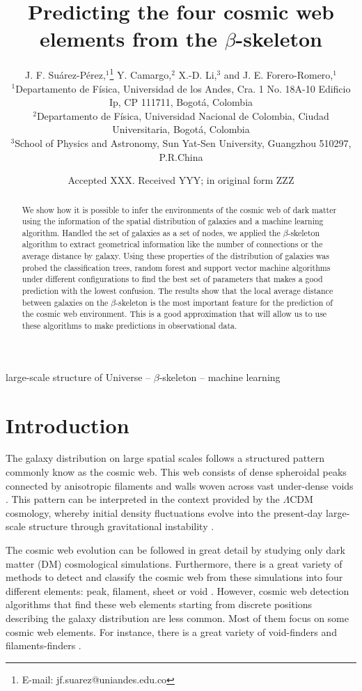 \documentclass[usenatbib]{mnras}
\title[Cosmic web elements and the $\beta$-skeleton]{Predicting the four cosmic web
  elements from the $\beta$-skeleton}
\author[J. F. Su\'arez-P\'erez et al.]{
J. F. Su\'arez-P\'erez,$^{1}$\thanks{E-mail: jf.suarez@uniandes.edu.co}
Y. Camargo,$^{2}$ 
X.-D. Li,$^{3}$
and J. E. Forero-Romero,$^{1}$
\\
$^{1}$Departamento de F\'isica, Universidad de los Andes, Cra. 1 No. 18A-10 Edificio Ip, CP 111711, Bogot\'a, Colombia\\
$^{2}$Departamento de F\'isica, Universidad Nacional de Colombia, Ciudad Universitaria, Bogot\'a, Colombia\\
$^{3}$School of Physics and Astronomy, Sun Yat-Sen University, Guangzhou 510297, P.R.China\\
}
\date{Accepted XXX. Received YYY; in original form ZZZ}
\begin{document}
\label{firstpage}
\pagerange{\pageref{firstpage}--\pageref{lastpage}}
\maketitle

\begin{abstract}
We show how it is possible to infer the environments of the cosmic web
of dark matter using the information of the spatial distribution of
galaxies and a machine learning algorithm. 
Handled the set of galaxies as a set of nodes, we applied the
$\beta$-skeleton algorithm to extract geometrical information like the
number of connections or the average distance by galaxy. 
Using these properties of the distribution of galaxies was probed the
classification trees, random forest and support vector machine algorithms under different
configurations to find the best set of parameters that makes a good
prediction with the lowest confusion.  
The results show that the local average distance between galaxies on
the $\beta$-skeleton is the most important feature for the prediction
of the cosmic web environment. 
This is a good approximation that will allow us to use these
algorithms to make predictions in observational data.  
\end{abstract}

\begin{keywords}
large-scale structure of Universe -- $\beta$-skeleton -- machine learning
\end{keywords}


\section{Introduction}
The galaxy distribution on large spatial scales follows a structured 
pattern commonly know as the cosmic web. 
This web consists of dense spheroidal peaks connected by
anisotropic filaments and walls woven across vast under-dense voids
\citep{Bond1996}. 
This pattern can be interpreted in the context provided by the
$\Lambda$CDM cosmology, whereby initial density fluctuations   evolve
into the present-day large-scale structure through gravitational
instability \citep{ZelDovich1970,White1987}.  

The cosmic web evolution can be followed in great detail by studying only dark matter (DM) cosmological simulations. 
Furthermore, there is a great variety of methods to detect and
classify the cosmic web from these simulations into four different 
elements: peak, filament, sheet or void \citep{Libeskind2018}.  
However, cosmic web detection algorithms that find these web elements
starting from discrete positions describing the galaxy distribution are
less common.
Most of them focus on some cosmic web elements.
For instance, there is a great variety of void-finders
\citep{Platen2007,Neyrinck2008} and filaments-finders
\citep{Novikov2003,Zhang2009,Sousbie2010,Chen2015,Luber2019}.   
\end{document}
